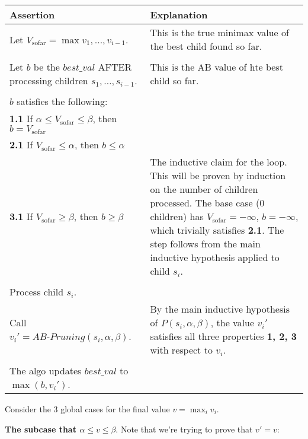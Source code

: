 \documentclass[11pt]{article}
\newenvironment{answercols}
  {\begin{center}\begin{tabular}{p{0.45\textwidth}p{0.45\textwidth}}
   \toprule
   \textbf{Assertion} & \textbf{Explanation} \\
   \midrule}
  {\\ \bottomrule\end{tabular}\end{center}}
\begin{document}
    \begin{answercols}
        Let $V_{\text{sofar}} = \max{v_1, \ldots, v_{i-1}}$. &
        This is the true minimax value of the best child found so far. \\
        \\
        Let $b$ be the $best\_val$ AFTER processing children $s_1, \ldots, s_{i-1}$. &
        This is the AB value of hte best child so far. \\
        \\
        $b$ satisfies the following: \\
        \textbf{1.1} If $\alpha \le V_{\text{sofar}} \le \beta$, then $b = V_{\text{sofar}}$ \\
        \textbf{2.1} If $V_{\text{sofar}} \le \alpha$, then $b \le \alpha$ \\
        \textbf{3.1} If $V_{\text{sofar}} \ge \beta$, then $b \ge \beta$ &
        The inductive claim for the loop. This will be proven by induction on the number of children processed. The base case (0 children) has $V_{\text{sofar}} = -\infty$, $b = -\infty$, which trivially satisfies \textbf{2.1}. The step follows from the main inductive hypothesis applied to child $s_i$. \\
        \\
        Process child $s_i$. \\ Call $v_{i}' = AB\text{-}Pruning(s_i, \alpha, \beta)$. &
        By the main inductive hypothesis of $P(s_i, \alpha, \beta)$, the value $v_{i}'$ satisfies all three properties \textbf{1, 2, 3} with respect to $v_i$. \\
        \\
        The algo updates $best\_val$ to $\max(b, v_{i}')$. & 
    \end{answercols}

    Consider the 3 global cases for the final value $v = \max_{i} v_i$.
    
    \newpage

    \textbf {The subcase that $\alpha \le v \le \beta$}. Note that we're trying to prove that $v' = v$:
\end{document}
